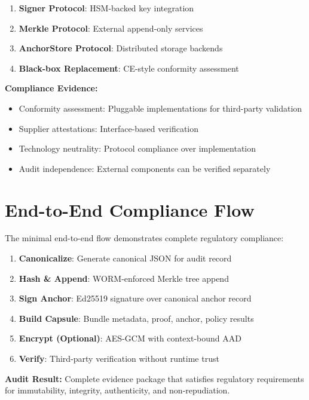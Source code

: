 \documentclass[11pt,a4paper]{article}
\begin{document}
\begin{enumerate}
    \item \textbf{Signer Protocol}: HSM-backed key integration
    \item \textbf{Merkle Protocol}: External append-only services
    \item \textbf{AnchorStore Protocol}: Distributed storage backends
    \item \textbf{Black-box Replacement}: CE-style conformity assessment
\end{enumerate}

\textbf{Compliance Evidence:}
\begin{itemize}
    \item Conformity assessment: Pluggable implementations for third-party validation
    \item Supplier attestations: Interface-based verification
    \item Technology neutrality: Protocol compliance over implementation
    \item Audit independence: External components can be verified separately
\end{itemize}

\section{End-to-End Compliance Flow}

The minimal end-to-end flow demonstrates complete regulatory compliance:

\begin{enumerate}
    \item \textbf{Canonicalize}: Generate canonical JSON for audit record
    \item \textbf{Hash \& Append}: WORM-enforced Merkle tree append
    \item \textbf{Sign Anchor}: Ed25519 signature over canonical anchor record
    \item \textbf{Build Capsule}: Bundle metadata, proof, anchor, policy results
    \item \textbf{Encrypt (Optional)}: AES-GCM with context-bound AAD
    \item \textbf{Verify}: Third-party verification without runtime trust
\end{enumerate}

\textbf{Audit Result:} Complete evidence package that satisfies regulatory requirements for immutability, integrity, authenticity, and non-repudiation.
\end{document}
